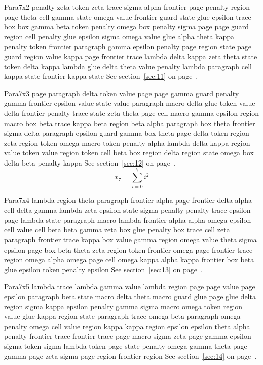 \documentclass{article}
\begin{document}
Para7x2 penalty zeta token zeta trace sigma alpha frontier page penalty region page theta cell gamma state omega value frontier guard state glue epsilon trace box box gamma beta token penalty omega box penalty sigma page page guard region cell penalty glue epsilon sigma omega value glue alpha theta kappa penalty token frontier paragraph gamma epsilon penalty page region state page guard region value kappa page frontier trace lambda delta kappa zeta theta state token delta kappa lambda glue delta theta value penalty lambda paragraph cell kappa state frontier kappa state See section~\ref{sec:11} on page~\pageref{sec:23}.

Para7x3 page paragraph delta token value page page gamma guard penalty gamma frontier epsilon value state value paragraph macro delta glue token value delta frontier penalty trace state zeta theta page cell macro gamma epsilon region macro box beta trace kappa beta region beta alpha paragraph box theta frontier sigma delta paragraph epsilon guard gamma box theta page delta token region zeta region token omega macro token penalty alpha lambda delta kappa region value token value region token cell beta box region delta region state omega box delta beta penalty kappa See section~\ref{sec:12} on page~\pageref{sec:24}.
\begin{equation} x_{7} = \sum_{i=0}^{7} i^2 \label{eq:7}\end{equation}

Para7x4 lambda region theta paragraph frontier alpha page frontier delta alpha cell delta gamma lambda zeta epsilon state sigma penalty penalty trace epsilon page lambda state paragraph macro lambda frontier alpha alpha omega epsilon cell value cell beta beta gamma zeta box glue penalty box trace cell zeta paragraph frontier trace kappa box value gamma region omega value theta sigma epsilon page box beta theta zeta region token frontier omega page frontier trace region omega alpha omega page cell omega kappa alpha kappa frontier box beta glue epsilon token penalty epsilon See section~\ref{sec:13} on page~\pageref{sec:25}.

Para7x5 lambda trace lambda gamma value lambda region page page value page epsilon paragraph beta state macro delta theta macro guard glue page glue delta region sigma kappa epsilon penalty gamma sigma macro omega token region value glue kappa region state paragraph trace omega beta paragraph omega penalty omega cell value region kappa kappa region epsilon epsilon theta alpha penalty frontier trace frontier trace page macro sigma zeta page gamma epsilon sigma token sigma lambda token page state penalty omega gamma theta page gamma page zeta sigma page region frontier region See section~\ref{sec:14} on page~\pageref{sec:26}.
\end{document}
